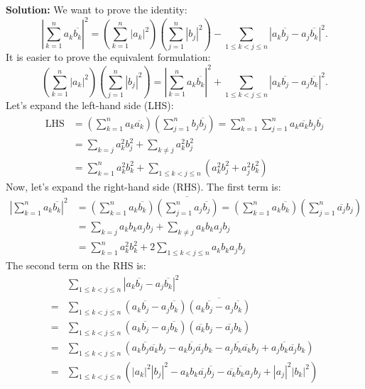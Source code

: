 \textbf{Solution:}
We want to prove the identity:
\[
\left| \sum_{k=1}^n a_k \overline{b_k} \right|^2 = \left( \sum_{k=1}^n |a_k|^2 \right) \left( \sum_{j=1}^n |b_j|^2 \right) - \sum_{1 \leq k < j \leq n} |a_k \overline{b_j} - a_j \overline{b_k}|^2.
\]
It is easier to prove the equivalent formulation:
\[
\left( \sum_{k=1}^n |a_k|^2 \right) \left( \sum_{j=1}^n |b_j|^2 \right) = \left| \sum_{k=1}^n a_k \overline{b_k} \right|^2 + \sum_{1 \leq k < j \leq n} |a_k \overline{b_j} - a_j \overline{b_k}|^2.
\]
Let's expand the left-hand side (LHS):
\begin{align*}
\text{LHS} &= \left( \sum_{k=1}^n a_k \overline{a_k} \right) \left( \sum_{j=1}^n b_j \overline{b_j} \right) = \sum_{k=1}^n \sum_{j=1}^n a_k \overline{a_k} b_j \overline{b_j} \\
&= \sum_{k=j} a_k^2 b_j^2 + \sum_{k \neq j} a_k^2 b_j^2 \\
&= \sum_{k=1}^n a_k^2 b_k^2 + \sum_{1 \leq k < j \leq n} (a_k^2 b_j^2 + a_j^2 b_k^2)
\end{align*}
Now, let's expand the right-hand side (RHS). The first term is:
\begin{align*}
\left| \sum_{k=1}^n a_k \overline{b_k} \right|^2 &= \left(\sum_{k=1}^n a_k \overline{b_k}\right) \overline{\left(\sum_{j=1}^n a_j \overline{b_j}\right)} = \left(\sum_{k=1}^n a_k \overline{b_k}\right) \left(\sum_{j=1}^n \overline{a_j} b_j\right) \\
&= \sum_{k=j} a_k b_k a_j b_j + \sum_{k \neq j} a_k b_k a_j b_j \\
&= \sum_{k=1}^n a_k^2 b_k^2 + 2 \sum_{1 \leq k < j \leq n} a_k b_k a_j b_j
\end{align*}
The second term on the RHS is:
\begin{align*}
&\sum_{1 \leq k < j \leq n} |a_k \overline{b_j} - a_j \overline{b_k}|^2 \\
=& \sum_{1 \leq k < j \leq n} (a_k \overline{b_j} - a_j \overline{b_k}) \overline{(a_k \overline{b_j} - a_j \overline{b_k})} \\
=& \sum_{1 \leq k < j \leq n} (a_k \overline{b_j} - a_j \overline{b_k}) (\overline{a_k} b_j - \overline{a_j} b_k) \\
=& \sum_{1 \leq k < j \leq n} (a_k \overline{b_j} \overline{a_k} b_j - a_k \overline{b_j} \overline{a_j} b_k - a_j \overline{b_k} \overline{a_k} b_j + a_j \overline{b_k} \overline{a_j} b_k) \\
=& \sum_{1 \leq k < j \leq n} (|a_k|^2 |b_j|^2 - a_k b_k \overline{a_j} \overline{b_j} - \overline{a_k} \overline{b_k} a_j b_j + |a_j|^2 |b_k|^2)
\end{align*}
